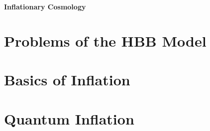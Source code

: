 \documentclass[12pt,a4paper]{article}
\begin{document}
\begin{center}
    \Huge\textbf{Inflationary Cosmology}
\end{center}

\renewcommand{\contentsname}{}
\renewcommand{\numberline}[1]{}
\tableofcontents
\vspace{1cm}

\section{Problems of the HBB Model}\label{sec:section1}



\section{Basics of Inflation}\label{sec:section2}



\section{Quantum Inflation}\label{sec:section3}



%
%
%
%
%
\end{document}
